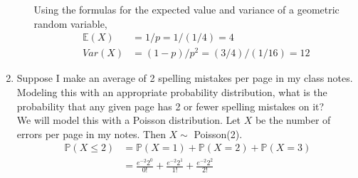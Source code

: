 \documentclass[12pt]{article}
\def\P{{\mathbb P}}
\def\E{{\mathbb E}}
\begin{document}
\begin{enumerate}
\begin{enumerate}
Using the formulas for the expected value and variance of a geometric random variable,
\begin{align*}
\E(X) &= 1/p = 1/(1/4) = 4 \\
Var(X) &= (1-p)/p^2 = (3/4)/(1/16) = 12
\end{align*}

\end{enumerate}

\item Suppose I make an average of 2 spelling mistakes per page in my class notes. Modeling this with an appropriate probability distribution, what is the probability that any given page has 2 or fewer spelling mistakes on it?\\

We will model this with a Poisson distribution. Let $X$ be the number of errors per page in my notes. Then $X \sim$ Poisson(2).
\begin{align*}
\P(X \leq 2) &= \P(X = 1) + \P(X = 2) + \P(X = 3)\\
&= \frac{e^{-2}2^0}{0!} + \frac{e^{-2}2^1}{1!} + \frac{e^{-2}2^2}{2!}
\end{align*}

\end{enumerate}
\end{document}
